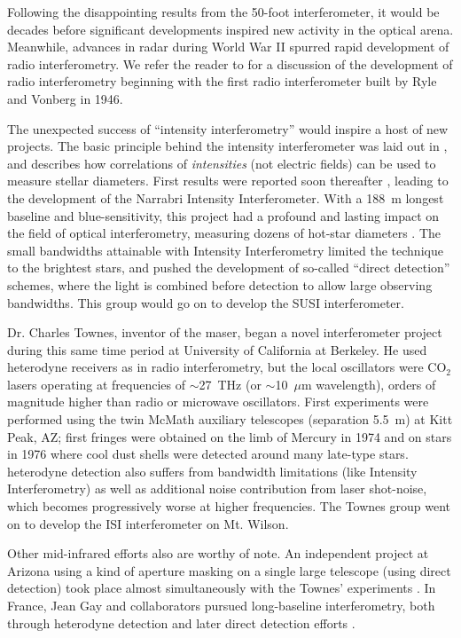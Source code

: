 \documentclass[12pt]{iopart}
\begin{document}
Following the disappointing results from the 50-foot interferometer,
it would be decades before significant developments inspired new
activity in the optical arena.  Meanwhile, advances in radar during
World War II spurred rapid development of radio interferometry.  We
refer the reader to \citet{tms2001} for a discussion of the
development of radio interferometry beginning with the first radio
interferometer built by Ryle and Vonberg in 1946.

The unexpected success of ``intensity interferometry'' would inspire a host of
new projects.  The basic principle behind the intensity interferometer
was laid out in \citet{hbt1956}, and describes how correlations of
{\em intensities} (not electric fields) can be used to measure stellar
diameters.  First results were reported soon thereafter
\citep{hbt1956b}, leading to the development of the Narrabri Intensity
Interferometer.  With a 188~m longest baseline and
blue-sensitivity, this project had a profound and lasting impact on
the field of optical interferometry, measuring dozens of hot-star
diameters
\citep[e.g.,][]{nii1967a,nii1967b,nii1970a,nii1970b,nii1974}.  The
small bandwidths attainable with Intensity Interferometry limited
the technique to the brightest stars, and pushed the development of
so-called ``direct detection'' schemes, where the light is combined
before detection to allow large observing bandwidths. This group would
go on to develop the SUSI interferometer.

Dr. Charles Townes, inventor of the maser, began a novel
interferometer project during this same time period at University of
California at Berkeley.  He used heterodyne receivers as in radio
interferometry, but the local oscillators were CO$_2$ lasers operating
at frequencies of $\sim$27~THz (or $\sim$10~$\mu$m wavelength), orders
of magnitude higher than radio or microwave oscillators.  First
experiments were performed using the twin McMath auxiliary telescopes
(separation 5.5~m) at Kitt Peak, AZ; first fringes were obtained on
the limb of Mercury in 1974 \citep{jbt1974} and on stars in 1976
\citep{sutton1977,sutton1978,sutton1979,sutton1982} where cool dust
shells were detected around many late-type stars.  heterodyne
detection also suffers from bandwidth limitations (like Intensity
Interferometry) as well as additional noise contribution from laser
shot-noise, which becomes progressively worse at higher frequencies.
The Townes group went on to develop the ISI interferometer on Mt.
Wilson.

Other mid-infrared efforts also are worthy of note.  An independent
project at Arizona using a kind of aperture masking on a single large
telescope (using direct detection) took place almost simultaneously with
the Townes' experiments \citep{mccarthy1975,mccarthy1977,mccarthy1978}.
In France, Jean Gay and collaborators pursued long-baseline
interferometry, both through heterodyne detection
\citep[e.g.,][]{gay1973, assus1979} and later direct detection
efforts \citep[e.g.,][]{rabbia1990}.
\end{document}
